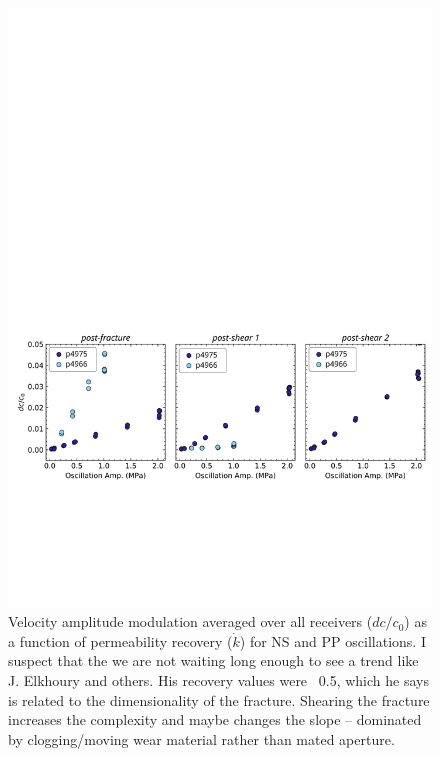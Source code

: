 \documentclass[letterpaper,10pt]{article}
\begin{document}
\begin{figure}[ht]
	\includegraphics[width=1\columnwidth]{Dc_PP_amp}
	\caption{Velocity amplitude modulation averaged over all receivers ($ dc/c_0 $) as a function of permeability recovery ($ \dot k $) for NS and PP oscillations. 
		I suspect that the we are not waiting long enough to see a trend like J. Elkhoury and others. His recovery values were ~0.5, which he says is related to the dimensionality of the fracture. Shearing the fracture increases the complexity and maybe changes the slope -- dominated by clogging/moving wear material rather than mated aperture.}
	\label{fig:dc_plots2}
\end{figure}

\newpage
\end{document}
